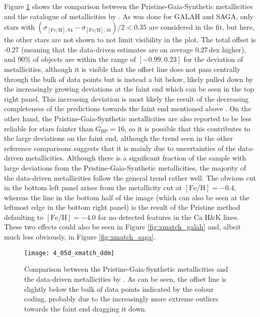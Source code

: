 \documentclass[a4paper,11pt]{article}
\begin{document}
Figure \ref{fig:xmatch_ddm} shows the comparison between the Pristine-Gaia-Synthetic metallicities and the catalogue of metallicities by \citet{andrae23}. As was done for GALAH and SAGA, only stars with $(\sigma_{\mathrm{[Fe/H]},84}-\sigma_{\mathrm{[Fe/H]},16})/2<0.35$ are considered in the fit, but here, the other stars are not shown to not limit visibility in the plot. The total offset is -0.27 (meaning that the data-driven estimates are on average 0.27\,dex higher), and 90\% of objects are within the range of $[-0.99,0.23]$ for the deviation of metallicities, although it is visible that the offset line does not pass centrally through the bulk of data points but is instead a bit below, likely pulled down by the increasingly growing deviations at the faint end which can be seen in the top right panel. This increasing deviation is most likely the result of the decreasing completeness of the predictions towards the faint end mentioned above \citep[see also Figure 3 in][]{andrae23}. On the other hand, the Pristine-Gaia-Synthetic metallicities are also reported to be less reliable for stars fainter than $G_\mathrm{BP}=16$, so it is possible that this contributes to the large deviations on the faint end, although the trend seen in the other reference comparisons suggests that it is mainly due to uncertainties of the data-driven metallicities. Although there is a significant fraction of the sample with large deviations from the Pristine-Gaia-Synthetic metallicities, the majority of the data-driven metallicities follow the general trend rather well. The obvious cut in the bottom left panel arises from the metallicity cut at $\mathrm{[Fe/H]}=-0.4$, whereas the line in the bottom half of the image (which can also be seen at the leftmost edge in the bottom right panel) is the result of the Pristine method defaulting to $\mathrm{[Fe/H]}=-4.0$ for no detected features in the Ca H\&K lines. These two effects could also be seen in Figure \ref{fig:xmatch_galah} and, albeit much less obviously, in Figure \ref{fig:xmatch_saga}.
%
\begin{figure}
 \centering
 \texttt{[image: 4\_05d\_xmatch\_ddm]}
 \caption[Metallicity comparison to data-driven metallicities]{Comparison between the Pristine-Gaia-Synthetic metallicities and the data-driven metallicities by \citet{andrae23}. As can be seen, the offset line is slightly below the bulk of data points indicated by the colour coding, probably due to the increasingly more extreme outliers towards the faint end dragging it down.}
 \label{fig:xmatch_ddm}
\end{figure}\\ \\
\end{document}
